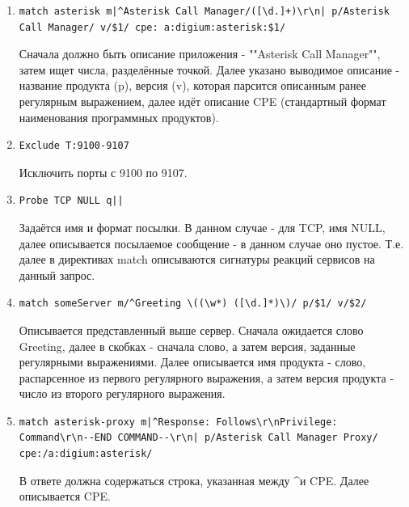 \documentclass[a4paper]{article}
\begin{document}
\begin{enumerate}

\item
\begin{lstlisting}[numbers=none, keywords={}]
match asterisk m|^Asterisk Call Manager/([\d.]+)\r\n| p/Asterisk Call Manager/ v/$1/ cpe: a:digium:asterisk:$1/
\end{lstlisting}

Сначала должно быть описание приложения - ""Asterisk Call Manager"", затем ищет числа, разделённые точкой.  Далее указано выводимое описание - название продукта (p), версия (v), которая парсится описанным ранее регулярным выражением, далее идёт описание CPE (стандартный формат наименования программных продуктов).

\item
\begin{lstlisting}[numbers=none, keywords={}]
Exclude T:9100-9107
\end{lstlisting}

Исключить порты с 9100 по 9107.

\item
\begin{lstlisting}[numbers=none, keywords={}]
Probe TCP NULL q||
\end{lstlisting}

Задаётся имя и формат посылки. В данном случае - для TCP, имя NULL, далее описывается посылаемое сообщение  - в данном случае оно пустое. Т.е. далее в директивах match описываются сигнатуры реакций сервисов на данный запрос.

\item
\begin{lstlisting}[numbers=none, keywords={}]
match someServer m/^Greeting \((\w*) ([\d.]*)\)/ p/$1/ v/$2/
\end{lstlisting}

Описывается представленный выше сервер. Сначала ожидается слово Greeting, далее в скобках - сначала слово, а затем версия, заданные регулярными выражениями. Далее описывается имя продукта - слово, распарсенное из первого регулярного выражения, а затем версия продукта - число из второго регулярного выражения.

\item
\begin{lstlisting}[numbers=none, keywords={}]
match asterisk-proxy m|^Response: Follows\r\nPrivilege: Command\r\n--END COMMAND--\r\n| p/Asterisk Call Manager Proxy/ cpe:/a:digium:asterisk/ 
\end{lstlisting}

В ответе должна содержаться строка, указанная между \textasciicircum  и CPE. Далее описывается CPE.

\end{enumerate}
\end{document}
